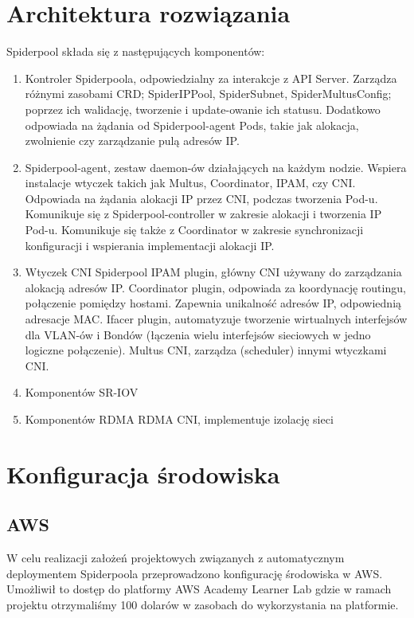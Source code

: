 \documentclass[onecolumn,12pt]{article}
\begin{document}
\section{Architektura rozwiązania}
Spiderpool składa się z następujących komponentów:
\begin{enumerate}
    \item Kontroler Spiderpoola, odpowiedzialny za interakcje z API Server. 
    Zarządza różnymi zasobami CRD; SpiderIPPool, SpiderSubnet, SpiderMultusConfig; poprzez ich walidację, tworzenie i update-owanie ich statusu. 
    Dodatkowo odpowiada na żądania od Spiderpool-agent Pods, takie jak alokacja, zwolnienie czy zarządzanie pulą adresów IP. 
    \item Spiderpool-agent, zestaw daemon-ów działających na każdym nodzie. 
    Wspiera instalacje wtyczek takich jak Multus, Coordinator, IPAM, czy CNI. 
    Odpowiada na żądania alokacji IP przez CNI, podczas tworzenia Pod-u. 
    Komunikuje się z Spiderpool-controller w zakresie alokacji i tworzenia IP Pod-u. 
    Komunikuje się także z Coordinator w zakresie synchronizacji konfiguracji i wspierania implementacji alokacji IP.
    \item Wtyczek CNI
    \newline Spiderpool IPAM plugin, główny CNI używany do zarządzania alokacją adresów IP.
    \newline Coordinator plugin, odpowiada za koordynację routingu, połączenie pomiędzy hostami. 
    Zapewnia unikalność adresów IP, odpowiednią adresacje MAC.
    \newline Ifacer plugin, automatyzuje tworzenie wirtualnych interfejsów dla VLAN-ów i Bondów (łączenia wielu interfejsów sieciowych w jedno logiczne połączenie).
    \newline Multus CNI, zarządza (scheduler) innymi wtyczkami CNI.
    \item Komponentów SR-IOV
    \item Komponentów RDMA
    \newline RDMA CNI, implementuje izolację sieci
\end{enumerate}


\section{Konfiguracja środowiska}

\subsection{AWS}
W celu realizacji założeń projektowych związanych z automatycznym deploymentem Spiderpoola 
przeprowadzono konfigurację środowiska w AWS. Umożliwił to dostęp do platformy AWS Academy Learner
Lab gdzie w ramach projektu otrzymaliśmy 100 dolarów w zasobach do wykorzystania na platformie. 
\end{document}
